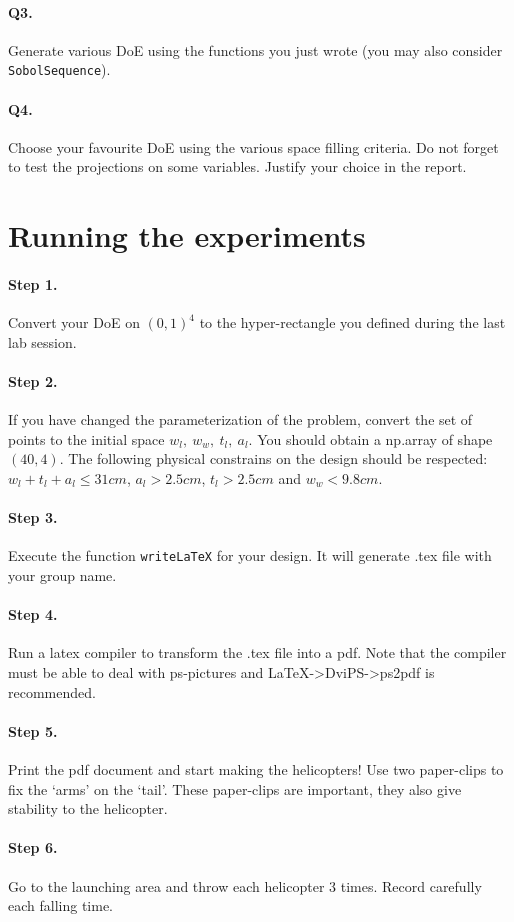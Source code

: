 \documentclass[12pt]{scrartcl}
\begin{document}
\paragraph{Q3.} Generate various DoE using the functions you just wrote (you may also consider \texttt{SobolSequence}). 

\paragraph{Q4.} Choose your favourite DoE using the various space filling criteria. Do not forget to test the projections on some variables. Justify your choice in the report. 

\section{Running the experiments}

\paragraph{Step 1.} Convert your DoE on $(0,1)^4$ to the hyper-rectangle you defined during the last lab session.

\paragraph{Step 2.} If you have changed the parameterization of the problem, convert the set of points to the initial space $w_l,\ w_w,\ t_l,\ a_l$. You should obtain a np.array of shape $(40,4)$. The following physical constrains on the design should be respected: $w_l + t_l + a_l \leq 31cm$, $a_l > 2.5cm$, $t_l > 2.5cm$ and $w_w < 9.8cm$.

\paragraph{Step 3.} Execute the function \texttt{writeLaTeX} for your design. It will generate .tex file with your group name.

\paragraph{Step 4.} Run a latex compiler to transform the .tex file into a pdf. Note that the compiler must be able to deal with ps-pictures and LaTeX->DviPS->ps2pdf is recommended.

\paragraph{Step 5.} Print the pdf document and start making the helicopters! Use two paper-clips to fix the `arms' on the `tail'. These paper-clips are important, they also give stability to the helicopter.

\paragraph{Step 6.} Go to the launching area and throw each helicopter 3 times. Record carefully each falling time.
\end{document}
